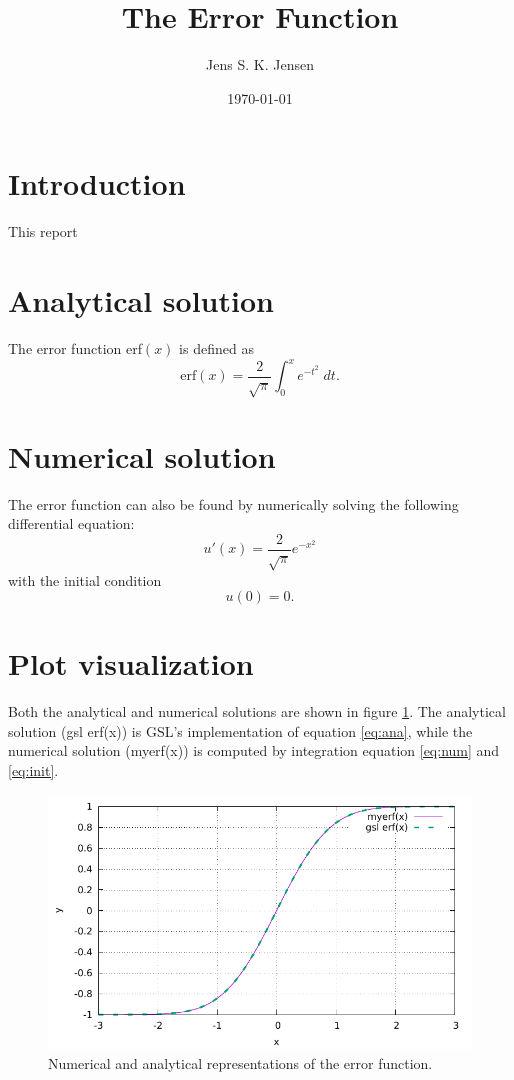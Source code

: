 \documentclass{article}
\begin{document}
\title{The Error Function}
\author{Jens S. K. Jensen}
\date{\today}
\maketitle

\section{Introduction}
This report 

\section{Analytical solution}
The error function erf$(x)$ is defined as
\begin{equation}
	\text{erf}(x) = \frac{2}{\sqrt{\pi}}\int_{0}^{x}e^{-t^2}\;dt.
	\label{eq:ana}
\end{equation}


\section{Numerical solution}
The error function can also be found by numerically solving the following differential equation:
\begin{equation}
	u'(x) = \frac{2}{\sqrt{\pi}}e^{-x^2}
	\label{eq:num}
\end{equation}
with the initial condition
\begin{equation}
	u(0) = 0.
	\label{eq:init}
\end{equation}

\section{Plot visualization}

Both the analytical and numerical solutions are shown in figure \ref{fig:plot}. The analytical solution (gsl erf(x)) is GSL's implementation of equation \ref{eq:ana}, while the numerical solution (myerf(x)) is computed by integration equation \ref{eq:num} and \ref{eq:init}.

\begin{figure}
	\centering
	\includegraphics{plot.pdf}
	\caption{Numerical and analytical representations of the error function.}
	\label{fig:plot}
\end{figure}
\end{document}
